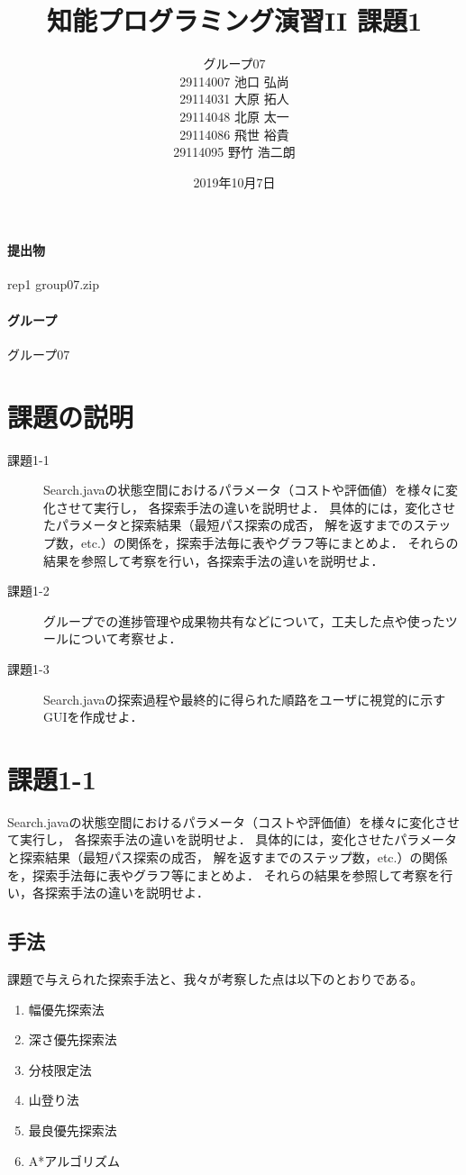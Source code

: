 \documentclass{jarticle}
\title{知能プログラミング演習II 課題1}
\author{グループ07\\
  29114007 池口 弘尚\\
  29114031 大原 拓人\\
  29114048 北原 太一\\
  29114086 飛世 裕貴\\
  29114095 野竹 浩二朗\\
}
\date{2019年10月7日}
\begin{document}
\maketitle

\paragraph{提出物} rep1 group07.zip
\paragraph{グループ} グループ07

\section{課題の説明}
\begin{description}
  \item[課題1-1] Search.javaの状態空間におけるパラメータ（コストや評価値）を様々に変化させて実行し，
        各探索手法の違いを説明せよ．
        具体的には，変化させたパラメータと探索結果（最短パス探索の成否，
        解を返すまでのステップ数，etc.）の関係を，探索手法毎に表やグラフ等にまとめよ．
        それらの結果を参照して考察を行い，各探索手法の違いを説明せよ．
  \item[課題1-2] グループでの進捗管理や成果物共有などについて，工夫した点や使ったツールについて考察せよ．
  \item[課題1-3] Search.javaの探索過程や最終的に得られた順路をユーザに視覚的に示すGUIを作成せよ．
\end{description}


\section{課題1-1}
\begin{screen}
  Search.javaの状態空間におけるパラメータ（コストや評価値）を様々に変化させて実行し，
  各探索手法の違いを説明せよ．
  具体的には，変化させたパラメータと探索結果（最短パス探索の成否，
  解を返すまでのステップ数，etc.）の関係を，探索手法毎に表やグラフ等にまとめよ．
  それらの結果を参照して考察を行い，各探索手法の違いを説明せよ．
\end{screen}
\subsection{手法}
課題で与えられた探索手法と、我々が考察した点は以下のとおりである。

\begin{enumerate}
  \item 幅優先探索法
  \item 深さ優先探索法
  \item 分枝限定法
  \item 山登り法
  \item 最良優先探索法
  \item A*アルゴリズム
\end{enumerate}
\end{document}

